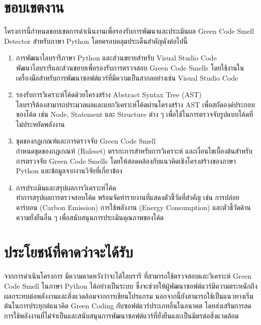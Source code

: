 \section{ขอบเขตงาน}
\label{Sec:ScopeOfWork}
โครงการนี้กำหนดขอบเขตการดำเนินงานเพื่อรองรับการพัฒนาและประเมินผล Green Code Smell Detector สำหรับภาษา Python โดยครอบคลุมประเด็นสำคัญดังต่อไปนี้
\begin{enumerate}
    \item {\boldfont การพัฒนาไลบรารีภาษา Python และส่วนขยายสำหรับ Visual Studio Code} \\
    พัฒนาไลบรารีและส่วนขยายเพื่อรองรับการตรวจสอบ Green Code Smells โดยใช้งานในเครื่องมือสำหรับการพัฒนาซอฟต์แวร์ที่มีความเป็นสากลอย่างเช่น Visual Studio Code
    \item {\boldfont รองรับการวิเคราะห์โค้ดด้วยโครงสร้าง Abstract Syntax Tree (AST)} \\
    ไลบรารีต้องสามารถประมวลผลและแยกวิเคราะห์โค้ดผ่านโครงสร้าง AST เพื่อสกัดองค์ประกอบของโค้ด เช่น Node, Statement และ Structure ต่าง ๆ เพื่อใช้ในการตรวจจับรูปแบบโค้ดที่ไม่ประหยัดพลังงาน
    \item {\boldfont ชุดของกฎเกณฑ์และการตรวจจับ Green Code Smell} \\
    กำหนดชุดของกฎเกณฑ์ (Ruleset) ตรรกะการสำหรับการวิเคราะห์ และเงื่อนไขเบื้องต้นสำหรับการตรวจจับ Green Code Smells โดยให้สอดคล้องกับแนวคิดเชิงโครงสร้างของภาษา Python และข้อมูลจากงานวิจัยที่เกี่ยวข้อง
    \item {\boldfont การประเมินและสรุปผลการวิเคราะห์โค้ด} \\
    ทำการสรุปผลการตรวจสอบโค้ด พร้อมจัดทำรายงานที่แสดงตัวชี้วัดที่สำคัญ เช่น การปล่อยคาร์บอน (Carbon Emission) การใช้พลังงาน (Energy Consumption) และตัวชี้วัดด้านความยั่งยืนอื่น ๆ เพื่อสนับสนุนการประเมินคุณภาพของโค้ด
\end{enumerate}


\section{ประโยชน์ที่คาดว่าจะได้รับ}
\label{Sec:ExpectedBenefit}
จากการดำเนินโครงการ มีความคาดหวังว่าจะได้ไลบรารี ที่สามารถใช้ตรวจสอบและวิเคราะห์ Green Code Smell ในภาษา Python ได้อย่างเป็นระบบ ซึ่งจะช่วยให้ผู้พัฒนาซอฟต์แวร์มีความตระหนักถึงผลกระทบต่อพลังงานและสิ่งแวดล้อมจากการเขียนโปรแกรม นอกจากนี้ยังสามารถใช้เป็นแนวทางเริ่มต้นในการประยุกต์แนวคิด Green Coding กับซอฟต์แวร์ประเภทอื่นในอนาคต โดยส่งเสริมการลดการใช้พลังงานที่ไม่จำเป็นและสนับสนุนการพัฒนาซอฟต์แวร์ที่ยั่งยืนและเป็นมิตรต่อสิ่งแวดล้อม

